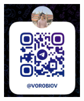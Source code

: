 \documentclass{beamer}
\begin{document}
        \begin{frame}
            \center
            \includegraphics[width=0.3\textwidth]{me.png}
        \end{frame}
    
\end{document}
